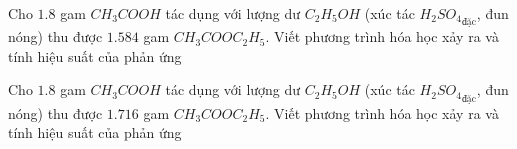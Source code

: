 \begin{bt}
Cho $1.8$ gam $CH_3COOH$ tác dụng với lượng dư $C_2H_5OH$ (xúc tác ${H_2SO_4}_{\text{đặc}}$, đun nóng) thu được $1.584$ gam $CH_3COOC_2H_5$. Viết phương trình hóa học xảy ra và tính hiệu suất của phản ứng
\end{bt}

\begin{bt}
Cho $1.8$ gam $CH_3COOH$ tác dụng với lượng dư $C_2H_5OH$ (xúc tác ${H_2SO_4}_{\text{đặc}}$, đun nóng) thu được $1.716$ gam $CH_3COOC_2H_5$. Viết phương trình hóa học xảy ra và tính hiệu suất của phản ứng
\end{bt}